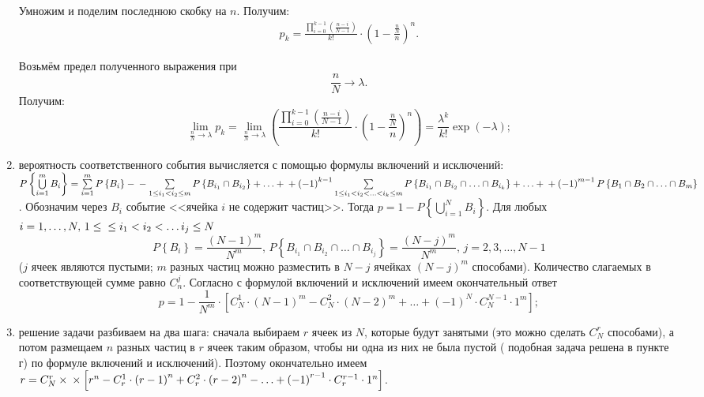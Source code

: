 \begin{enumerate}[label=\alph*)]
Умножим и поделим последнюю скобку на $n$.
Получим:
\begin{equation*}
\begin{split}
p_k =
\frac{ \prod \limits_{i=0}^{k-1} \left( \frac{n-i}{N-1} \right)}{k!} \cdot \left( 1 - \frac{ \frac{n}{N} }{n} \right)^n.
\end{split}
\end{equation*}

Возьмём предел полученного выражения при 
$$ \frac{n}{N} \rightarrow \lambda.$$
Получим:
$$ \lim \limits_{ \frac{n}{N} \rightarrow \lambda } p_k =
\lim \limits_{ \frac{n}{N} \rightarrow \lambda }
\left( \frac{ \prod \limits_{i=0}^{k-1} \left( \frac{n-i}{N-1} \right)}{k!} \cdot \left( 1 - \frac{ \frac{n}{N} }{n} \right)^n \right) =
\frac{ \lambda^k}{k!} \exp \left( - \lambda \right);$$

\item вероятность соответственного события вычисляется с помощью формулы включений и исключений:
$P \left\{ \bigcup \limits_{i=1}^m B_i \right\} =
\sum \limits_{i=1}^m P \left\{ B_i \right\} - \\
- \sum \limits_{1 \leq i_1 < i_2 \leq m} P \left\{ B_{i_1} \cap B_{i_2} \right\} + \dotsc + \\
+ \left( -1 \right)^{k-1} \sum \limits_{1 \leq i_1 < i_2 < \dotsc < i_k \leq m} P \left\{ B_{i_1} \cap B_{i_2} \cap \dotsc \cap B_{i_k} \right\} + \dotsc + \\
+ \left( -1 \right)^{m-1} P \left\{ B_1 \cap B_2 \cap \dotsc \cap B_m \right\}$.
Обозначим через $B_i$ событие <<ячейка $i$ не содержит частиц>>.
Тогда $p = 1 - P \left\{ \bigcup \limits_{i=1}^N B_i \right\}$.
Для любых $i = 1, \dotsc, N, \, 1 \leq \\
\leq i_1 < i_2 < \dotsc i_j \leq N$
$$P \left\{ B_i \right\} =
\frac{ \left( N-1 \right)^m}{N^m}, \,
P \left\{ B_{i_1} \cap B_{i_2} \cap \dotsc \cap B_{i_j} \right\} =
\frac{ \left( N-j \right)^m}{N^m}, \,
j = 2, 3, \dotsc, N-1$$
($j$ ячеек являются пустыми; $m$ разных частиц можно разместить в $N - j$ ячейках $ \left( N-j \right)^m$ способами).
Количество слагаемых в соответствующей сумме равно $C_n^j$.
Согласно с формулой включений и исключений имеем окончательный ответ
$$p =
1 - \frac{1}{N^m} \cdot \left[ C_N^1 \cdot \left( N-1 \right)^m - C_N^2 \cdot \left( N-2 \right)^m + \dotsc + \left( -1 \right)^N \cdot C_N^{N-1} \cdot 1^m \right];$$

\item решение задачи разбиваем на два шага: сначала выбираем $r$ ячеек из $N$, которые будут занятыми (это можно сделать $C_N^r$ способами),
а потом размещаем $n$ разных частиц в $r$ ячеек таким образом, чтобы ни одна из них не была пустой ( подобная задача решена в пункте г) по формуле включений и исключений).
Поэтому окончательно имеем
$r =
C_N^r \times \\
\times \left[ r^n - C_r^1 \cdot \left( r-1 \right)^n + C_r^2 \cdot \left( r-2 \right)^n - \dotsc + \left( -1 \right)^{r-1} \cdot C_r^{r-1} \cdot 1^n \right]$.
\end{enumerate}

